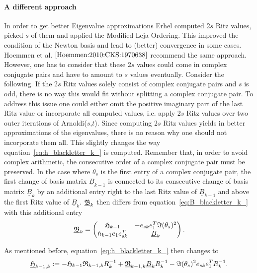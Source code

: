 \documentclass{scrartcl}
\numberwithin{equation}{section}
\begin{document}
\paragraph{A different approach}
In order to get better Eigenvalue approximations Erhel \cite{Erhel95aparallel} computed 2$s$ Ritz values, picked $s$ of them and applied the Modified Leja Ordering. This improved the condition of the Newton basis and lead to (better) convergence in some cases. Hoemmen et al. $\cite{Hoemmen:2010:CKS:1970638}$ recommend the same approach. However, one has to consider that these 2$s$ values could come in complex conjugate pairs and have to amount to $s$ values eventually. Consider the following. If the 2$s$ Ritz values solely consist of complex conjugate pairs and $s$ is odd, there is no way this would fit without splitting a complex conjugate pair. To address this issue one could either omit the positive imaginary part of the last Ritz value or incorporate all computed values, i.e. apply 2$s$ Ritz values over two outer iterations of Arnoldi($s$,$t$). Since computing 2$s$ Ritz values yields in better approximations of the eigenvalues, there is no reason why one should not incorporate them all. This slightly changes the way equation~\eqref{eq:h_blackletter_k_} is computed. Remember that, in order to avoid complex arithmetic, the consecutive order of a complex conjugate pair must be preserved. In the case where $\theta_s$ is the first entry of a complex conjugate pair, the first change of basis matrix $\underline{B}_{k - 1 }$ is connected to its consecutive change of basis matrix $\underline{B}_{k}$ by an additional entry right to the last Ritz value of $\underline{B}_{k - 1}$ and above the first Ritz value of $\underline{B}_k$. $\underline{\frak{B}}_k$ then differs from equation~\eqref{eq:B_blackletter_k_} with this additional entry
\begin{equation}
\underline{\frak{B}}_{k} = 
\begin{pmatrix}
	\frak{H}_{k - 1} & -e_{sk} e^T_1 \Im (\theta_s)^2 \\
	h_{k - 1} e_1 e^T_{sk} & \underline{B}_k
\end{pmatrix}.
\end{equation}

As mentioned before, equation~\eqref{eq:h_blackletter_k_} then changes to
\begin{equation}
\underline{\frak{H}}_{k - 1, k} := -\frak{H}_{k - 1} \frak{R}_{k - 1, k} R^{-1}_k + \underline{\frak{R}}_{k - 1, k} \underline{B}_k R^{-1}_k - \Im (\theta_s)^2 e_{sk} e^T_1  R^{-1}_{k}.
\end{equation}
\end{document}
